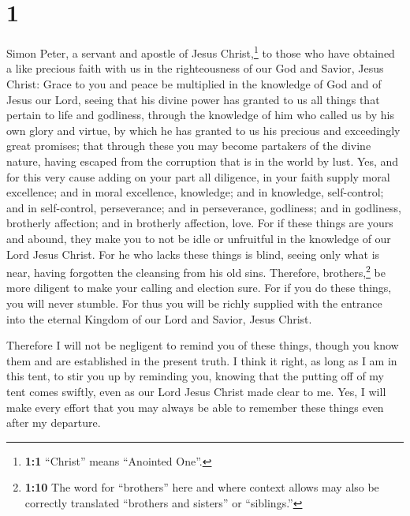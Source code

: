 \hypertarget{section}{%
\section{1}\label{section}}

 Simon Peter, a servant and apostle of Jesus
Christ,\footnote{\textbf{1:1} ``Christ'' means ``Anointed One''.} to
those who have obtained a like precious faith with us in the
righteousness of our God and Savior, Jesus Christ:  Grace
to you and peace be multiplied in the knowledge of God and of Jesus our
Lord,  seeing that his divine power has granted to us all
things that pertain to life and godliness, through the knowledge of him
who called us by his own glory and virtue,  by which he
has granted to us his precious and exceedingly great promises; that
through these you may become partakers of the divine nature, having
escaped from the corruption that is in the world by lust. 
Yes, and for this very cause adding on your part all diligence, in your
faith supply moral excellence; and in moral excellence, knowledge;
 and in knowledge, self-control; and in self-control,
perseverance; and in perseverance, godliness;  and in
godliness, brotherly affection; and in brotherly affection, love.
 For if these things are yours and abound, they make you
to not be idle or unfruitful in the knowledge of our Lord Jesus Christ.
 For he who lacks these things is blind, seeing only what
is near, having forgotten the cleansing from his old sins.
 Therefore, brothers,\footnote{\textbf{1:10} The word for
  ``brothers'' here and where context allows may also be correctly
  translated ``brothers and sisters'' or ``siblings.''} be more diligent
to make your calling and election sure. For if you do these things, you
will never stumble.  For thus you will be richly supplied
with the entrance into the eternal Kingdom of our Lord and Savior, Jesus
Christ.

 Therefore I will not be negligent to remind you of these
things, though you know them and are established in the present truth.
 I think it right, as long as I am in this tent, to stir
you up by reminding you,  knowing that the putting off of
my tent comes swiftly, even as our Lord Jesus Christ made clear to me.
 Yes, I will make every effort that you may always be
able to remember these things even after my departure.

